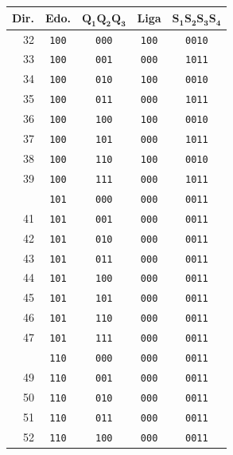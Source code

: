 \begin{minipage}[t]{0.48\textwidth}\centering
\begin{tabular}{@{}r c c c c@{}}
\toprule
\textbf{Dir.} & \textbf{Edo.} & $\mathbf{Q_1Q_2Q_3}$ & \textbf{Liga} & $\mathbf{S_1S_2S_3S_4}$ \\
\midrule
32 & \texttt{100} & \texttt{000} & \texttt{100} & \texttt{0010} \\
33 & \texttt{100} & \texttt{001} & \texttt{000} & \texttt{1011} \\
34 & \texttt{100} & \texttt{010} & \texttt{100} & \texttt{0010} \\
35 & \texttt{100} & \texttt{011} & \texttt{000} & \texttt{1011} \\
36 & \texttt{100} & \texttt{100} & \texttt{100} & \texttt{0010} \\
37 & \texttt{100} & \texttt{101} & \texttt{000} & \texttt{1011} \\
38 & \texttt{100} & \texttt{110} & \texttt{100} & \texttt{0010} \\
39 & \texttt{100} & \texttt{111} & \texttt{000} & \texttt{1011} \\
\addlinespace[2pt]
40 & \texttt{101} & \texttt{000} & \texttt{000} & \texttt{0011} \\
41 & \texttt{101} & \texttt{001} & \texttt{000} & \texttt{0011} \\
42 & \texttt{101} & \texttt{010} & \texttt{000} & \texttt{0011} \\
43 & \texttt{101} & \texttt{011} & \texttt{000} & \texttt{0011} \\
44 & \texttt{101} & \texttt{100} & \texttt{000} & \texttt{0011} \\
45 & \texttt{101} & \texttt{101} & \texttt{000} & \texttt{0011} \\
46 & \texttt{101} & \texttt{110} & \texttt{000} & \texttt{0011} \\
47 & \texttt{101} & \texttt{111} & \texttt{000} & \texttt{0011} \\
\addlinespace[2pt]
48 & \texttt{110} & \texttt{000} & \texttt{000} & \texttt{0011} \\
49 & \texttt{110} & \texttt{001} & \texttt{000} & \texttt{0011} \\
50 & \texttt{110} & \texttt{010} & \texttt{000} & \texttt{0011} \\
51 & \texttt{110} & \texttt{011} & \texttt{000} & \texttt{0011} \\
52 & \texttt{110} & \texttt{100} & \texttt{000} & \texttt{0011} \\

\end{tabular}
\end{minipage}
